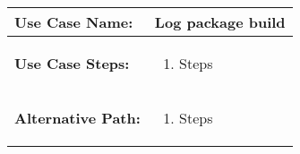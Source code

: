 \medskip

\begin{tabularx}{\linewidth}{|l|X|}
\hline
\textbf{Use Case Name:} & \textbf{Log package build} \\
\hline
\textbf{Use Case Steps:} & 
\begin{minipage}{\linewidth} 
  \vspace{0.05em}
  \begin{enumerate}
   \item Steps
  \end{enumerate}
  \vspace{0.05em}
\end{minipage}
\\
\hline 
\textbf{Alternative Path:} &
\begin{minipage}{\linewidth}
  \vspace{0.05em} 
  \begin{enumerate}
    \item Steps
  \end{enumerate}
  \vspace{0.05em} 
\end{minipage}
\\
\hline
\end{tabularx}

\newpage


